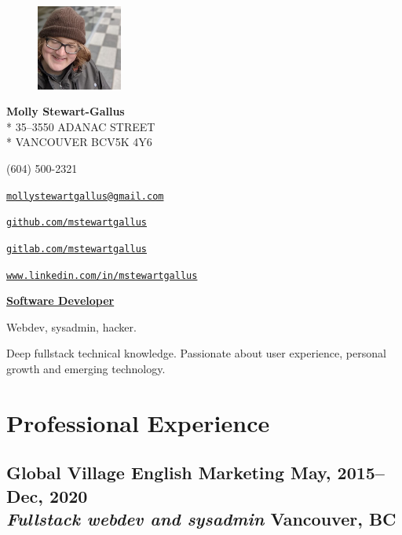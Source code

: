 \documentclass[oneside]{scrartcl}
\makeatletter
\newcommand{\experience}[4]{
  \subsection[#1]{#1 \hfill \small #4 \\
  \textmd{\textit{#2} \hfill #3}}}
\newcommand{\email}{mollystewartgallus@gmail.com}
\newcommand{\github}{github.com/mstewartgallus}
\newcommand{\gitlab}{gitlab.com/mstewartgallus}
\newcommand{\linkedin}{www.linkedin.com/in/mstewartgallus}
\makeatother
\begin{document}
{
\begin{figure}
  \raggedleft
   \includegraphics[width=0.249\textwidth]{molly-happy}
\end{figure}


{\Large \textbf{Molly Stewart-Gallus}}\\*
35--3550 ADANAC STREET\\*
VANCOUVER BC\hspace{0.5em}V5K 4Y6
\begin{description}[nosep]
\item[Phone] (604) 500-2321
\item[Email] \href{mailto://\email}{\nolinkurl{\email}}
\item[GitHub] \href{https://\github}{\nolinkurl{\github}}
\item[GitLab] \href{https://\gitlab}{\nolinkurl{\gitlab}}
\item[LinkedIn] \href{https://\linkedin}{\nolinkurl{\linkedin}}
\end{description}
}

\bigskip

\underline{\textbf{\LARGE{}Software Developer}}

\bigskip

Webdev, sysadmin, hacker.

Deep fullstack technical
knowledge. Passionate about user experience, personal growth and
emerging technology.

\section{Professional Experience}
\experience{Global Village English Marketing}
{Fullstack webdev and sysadmin}{Vancouver, BC}{May, 2015--Dec, 2020}
\end{document}
